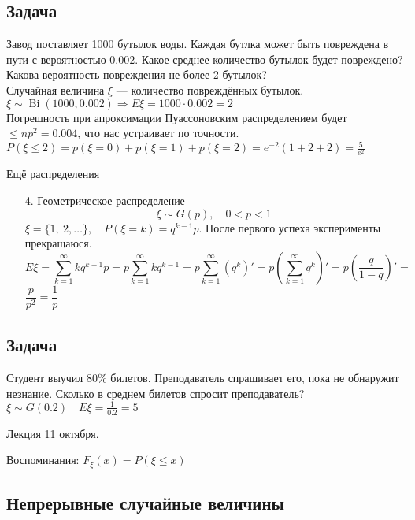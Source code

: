 \documentclass[12pt, a4paper]{article}
\begin{document}
    \subsection*{Задача}
    Завод поставляет 1000 бутылок воды. Каждая бутлка может быть повреждена в пути с вероятностью $0.002$. Какое среднее количество бутылок будет повреждено? Какова вероятность повреждения не более 2 бутылок?\\
    Случайная величина $\xi$ --- количество повреждённых бутылок.\\
    $\xi \sim \operatorname{Bi}(1000, 0.002)\Rightarrow E\xi = 1000\cdot 0.002 = 2$\\
    Погрешность при апроксимации Пуассоновским распределением будет $\leq np^2 = 0.004$, что нас устраивает по точности.\\
    $P(\xi \leq 2) = p(\xi = 0) + p(\xi = 1) + p(\xi = 2) = e^{-2}(1 + 2 + 2) = \frac{5}{e^2}$
    \begin{center}
        Ещё распределения
    \end{center}
    \begin{enumerate}
        \item[4.] Геометрическое распределение
        \[\xi\sim G(p),\quad 0 < p < 1\]
        $\xi = \{1,\ 2,\dots\},\quad P(\xi = k) = q^{k - 1}p$. После первого успеха эксперименты прекращаюся.\\
        \[E\xi = \sum_{k = 1}^{\infty} k q^{k - 1} p = p \sum_{k = 1}^{\infty} k q^{k - 1} = p \sum_{k = 1}^{\infty}\left( q^k \right)' = p\left( \sum_{k = 1}^{\infty} q^k \right)' =  p\left( \frac{q}{1 - q} \right)' =\]
        $\dfrac{p}{p^2} = \dfrac{1}{p}$
    \end{enumerate}
    \subsection*{Задача}
    Студент выучил 80\% билетов. Преподаватель спрашивает его, пока не обнаружит незнание. Сколько в среднем билетов спросит преподаватель?\\
    $\xi \sim G(0.2)\quad E\xi = \frac{1}{0.2} = 5$

    \begin{center}
        Лекция 11 октября.
    \end{center}
    Воспоминания: $F_{\xi}(x) = P(\xi \leq x)$
    \begin{center}
        \section*{Непрерывные случайные величины}
    \end{center}
\end{document}
